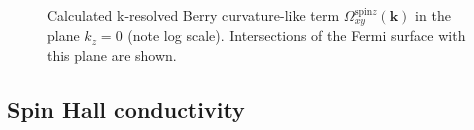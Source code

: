 \begin{figure}[htb!]
	\centering
	\qquad
	\caption{Calculated k-resolved Berry curvature-like term $\Omega_{xy}^{\text{spin}z}(\bm k)$ in the plane $k_z=0$ (note log scale). Intersections of the Fermi surface
		with this plane are shown.}
	\label{fig29.2}
\end{figure}

\clearpage
\subsection*{Spin Hall conductivity}

